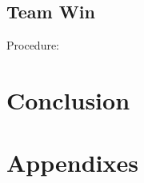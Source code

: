 \documentclass[%
 reprint,
 amsmath,amssymb,
 aps,
]{revtex4-1}
\begin{document}
\subsection{Team Win}

Procedure:



\section{Conclusion}

\begin{acknowledgments}
\end{acknowledgments}

\appendix

\section{Appendixes}



\end{document}
